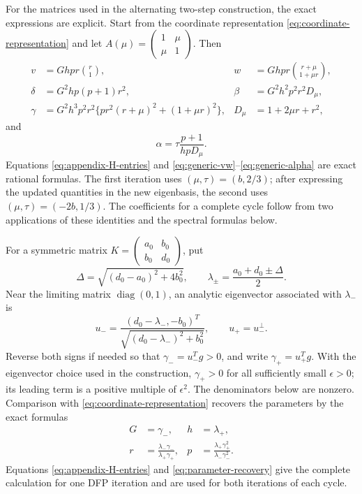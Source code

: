 \documentclass[11pt]{article}
\begin{document}
For the matrices used in the alternating two-step construction, the exact
expressions are explicit.  Start from the coordinate representation
\eqref{eq:coordinate-representation} and let
$A(\mu)=\left(\begin{smallmatrix}1&\mu\\\mu&1\end{smallmatrix}\right)$.
Then
\begin{align}
v&=Ghp r\binom{r}{1},
&w&=Ghp r\binom{r+\mu}{1+\mu r},
\label{eq:generic-vw}\\
\delta&=G^2hp(p+1)r^2,
&\beta&=G^2h^2p^2r^2D_\mu,
\label{eq:generic-delta-beta}\\
\gamma&=G^2h^3p^2r^2
\{pr^2(r+\mu)^2+(1+\mu r)^2\},
&D_\mu&=1+2\mu r+r^2,
\label{eq:generic-gamma}
\end{align}
and
\begin{equation}\label{eq:generic-alpha}
\alpha=\tau\frac{p+1}{hpD_\mu}.
\end{equation}
Equations \eqref{eq:appendix-H-entries} and
\eqref{eq:generic-vw}--\eqref{eq:generic-alpha} are exact rational formulas.
The first iteration uses $(\mu,\tau)=(b,2/3)$; after expressing the updated
quantities in the new eigenbasis, the second uses
$(\mu,\tau)=(-2b,1/3)$.  The coefficients for a complete cycle follow from two
applications of these identities and the spectral formulas below.

For a symmetric matrix
$K=\left(\begin{smallmatrix}a_0&b_0\\b_0&d_0\end{smallmatrix}\right)$,
put
\[
\Delta=\sqrt{(d_0-a_0)^2+4b_0^2},\qquad
\lambda_\pm=\frac{a_0+d_0\pm\Delta}{2}.
\]
Near the limiting matrix $\operatorname{diag}(0,1)$, an analytic eigenvector
associated with $\lambda_-$ is
\[
u_-=
\frac{(d_0-\lambda_-,-b_0)^T}
{\sqrt{(d_0-\lambda_-)^2+b_0^2}},
\qquad u_+=u_-^\perp.
\]
Reverse both signs if needed so that $\gamma_-=u_-^Tg>0$, and write
$\gamma_+=u_+^Tg$.  With the eigenvector choice used in the construction,
$\gamma_+>0$ for all sufficiently small $\epsilon>0$; its leading term is a
positive multiple of $\epsilon^2$.  The denominators below are nonzero.
Comparison with \eqref{eq:coordinate-representation} recovers the
parameters by the exact formulas
\begin{equation}\label{eq:parameter-recovery}
\begin{aligned}
G&=\gamma_-, & h&=\lambda_+,\\
r&=\frac{\lambda_-\gamma_-}{\lambda_+\gamma_+}, &
p&=\frac{\lambda_+\gamma_+^2}{\lambda_-\gamma_-^2}.
\end{aligned}
\end{equation}
Equations \eqref{eq:appendix-H-entries} and
\eqref{eq:parameter-recovery} give the complete calculation for one DFP
iteration and are used for both iterations of each cycle.
\end{document}
